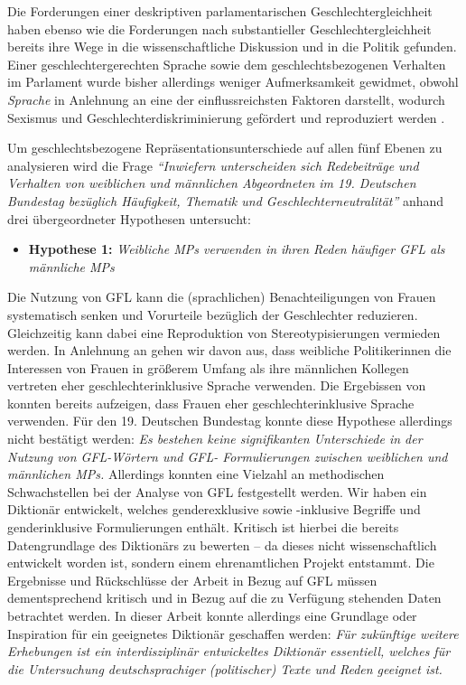 \documentclass[12pt, 
    twoside=false, 
    bibliography=totoc, 
    numbers=endperiod, 
    headings=normal, 
    toc=chapterentrydotfill
    ]{scrbook}
\begin{document}
Die Forderungen einer deskriptiven parlamentarischen Geschlechtergleichheit haben ebenso wie die Forderungen nach substantieller Geschlechtergleichheit bereits ihre Wege in die wissenschaftliche Diskussion und in die Politik gefunden. Einer geschlechtergerechten Sprache sowie dem geschlechtsbezogenen Verhalten im Parlament wurde bisher allerdings weniger Aufmerksamkeit gewidmet, obwohl \emph{Sprache} in Anlehnung an \textcite{menegatti_2017} eine der einflussreichsten Faktoren darstellt, wodurch Sexismus und Geschlechterdiskriminierung gefördert und reproduziert werden \parencite*[1]{menegatti_2017}.

Um geschlechtsbezogene Repräsentationsunterschiede auf allen fünf Ebenen zu analysieren wird die Frage \emph{\enquote{Inwiefern unterscheiden sich Redebeiträge und Verhalten von weiblichen und männlichen Abgeordneten im 19. Deutschen Bundestag bezüglich Häufigkeit, Thematik und Geschlechterneutralität}} anhand drei übergeordneter Hypothesen untersucht:

\begin{itemize}
    \item \textbf{Hypothese 1:} \emph{Weibliche MPs verwenden in ihren Reden häufiger GFL als männliche MPs}
\end{itemize}

Die Nutzung von GFL kann die (sprachlichen) Benachteiligungen von Frauen systematisch senken und Vorurteile bezüglich der Geschlechter reduzieren. Gleichzeitig kann dabei eine Reproduktion von Stereotypisierungen vermieden werden. In Anlehnung an \textcite{wangnerud_2000} gehen wir davon aus, dass weibliche Politikerinnen die Interessen von Frauen in größerem Umfang als ihre männlichen Kollegen vertreten \parencite[69f.]{wangnerud_2000} eher geschlechterinklusive Sprache verwenden. Die Ergebissen von \textcite{koeser_2014} konnten bereits aufzeigen, dass Frauen eher geschlechterinklusive Sprache verwenden. Für den 19. Deutschen Bundestag konnte diese Hypothese allerdings nicht bestätigt werden: \emph{Es bestehen keine signifikanten Unterschiede in der Nutzung von GFL-Wörtern und GFL- Formulierungen zwischen weiblichen und männlichen MPs.} Allerdings konnten eine Vielzahl an methodischen Schwachstellen bei der Analyse von GFL festgestellt werden. Wir haben ein Diktionär entwickelt, welches genderexklusive sowie -inklusive Begriffe und genderinklusive Formulierungen enthält. Kritisch ist hierbei die bereits Datengrundlage des Diktionärs zu bewerten -- da dieses nicht wissenschaftlich entwickelt worden ist, sondern einem ehrenamtlichen Projekt entstammt. Die Ergebnisse und Rückschlüsse der Arbeit in Bezug auf GFL müssen dementsprechend kritisch und in Bezug auf die zu Verfügung stehenden Daten betrachtet werden. In dieser Arbeit konnte allerdings eine Grundlage oder Inspiration für ein geeignetes Diktionär geschaffen werden: \emph{Für zukünftige weitere Erhebungen ist ein interdisziplinär entwickeltes Diktionär essentiell, welches für die Untersuchung deutschsprachiger (politischer) Texte und Reden geeignet ist.}
\end{document}
